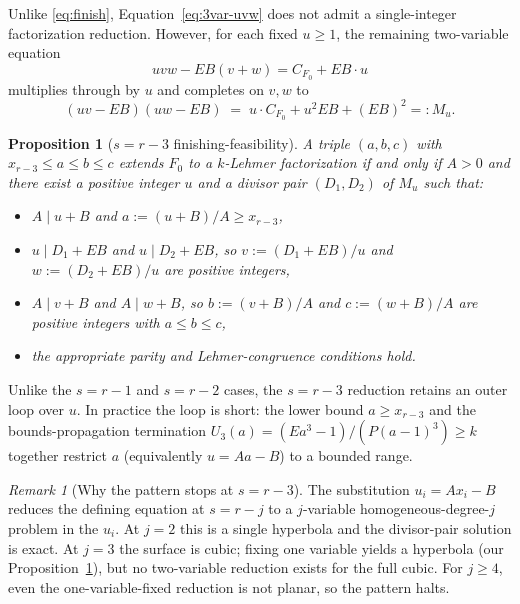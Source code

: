 \documentclass[11pt]{article}
\newtheorem{proposition}[theorem]{Proposition}
\theoremstyle{definition}
\theoremstyle{remark}
\newtheorem{remark}[theorem]{Remark}
\begin{document}
Unlike \eqref{eq:finish}, Equation~\eqref{eq:3var-uvw} does not admit
a single-integer factorization reduction.  However, for each fixed
$u \ge 1$, the remaining two-variable equation
\[
  uvw - EB(v + w) = C_{F_0} + EB \cdot u
\]
multiplies through by $u$ and completes on $v, w$ to
\begin{equation}\label{eq:3var-fixed-u}
  (u v - EB)(u w - EB) \;=\; u \cdot C_{F_0} + u^2 EB + (EB)^2 =: M_u.
\end{equation}

\begin{proposition}[$s = r - 3$ finishing-feasibility]\label{prop:rm3}
A triple $(a, b, c)$ with $x_{r-3} \le a \le b \le c$ extends $F_0$
to a $k$-Lehmer factorization if and only if $A > 0$ and there exist
a positive integer $u$ and a divisor pair $(D_1, D_2)$ of $M_u$ such
that:
\begin{itemize}
  \item $A \mid u + B$ and $a := (u + B)/A \ge x_{r-3}$,
  \item $u \mid D_1 + EB$ and $u \mid D_2 + EB$, so $v := (D_1 +
    EB)/u$ and $w := (D_2 + EB)/u$ are positive integers,
  \item $A \mid v + B$ and $A \mid w + B$, so $b := (v + B)/A$ and
    $c := (w + B)/A$ are positive integers with $a \le b \le c$,
  \item the appropriate parity and Lehmer-congruence conditions hold.
\end{itemize}
\end{proposition}

Unlike the $s = r - 1$ and $s = r - 2$ cases, the $s = r - 3$ reduction
retains an outer loop over $u$.  In practice the loop is short: the
lower bound $a \ge x_{r-3}$ and the bounds-propagation termination
$U_3(a) = (E a^3 - 1)/(P (a-1)^3) \ge k$ together restrict $a$
(equivalently $u = Aa - B$) to a bounded range.

\begin{remark}[Why the pattern stops at $s = r - 3$]\label{rem:stops}
The substitution $u_i = Ax_i - B$ reduces the defining equation at
$s = r - j$ to a $j$-variable homogeneous-degree-$j$ problem in the
$u_i$. At $j = 2$ this is a single hyperbola and the divisor-pair
solution is exact. At $j = 3$ the surface is cubic; fixing one
variable yields a hyperbola (our Proposition~\ref{prop:rm3}), but no
two-variable reduction exists for the full cubic. For $j \ge 4$, even
the one-variable-fixed reduction is not planar, so the pattern halts.
\end{remark}
\end{document}
